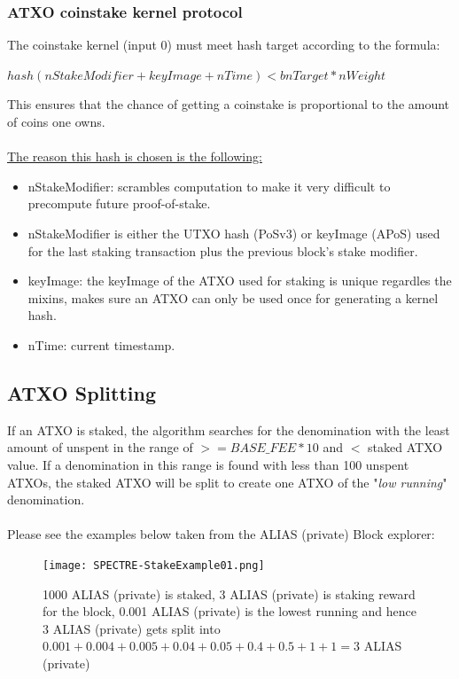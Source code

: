 \subsubsection{ATXO coinstake kernel protocol}
The coinstake kernel (input 0) must meet hash target according to the formula:



\vspace{5mm} %
$ hash(nStakeModifier + keyImage + nTime) < bnTarget * nWeight  $
\vspace{5mm} %

\noindent
This ensures that the chance of getting a coinstake is proportional to
the amount of coins one owns.
\\
\\
\noindent
\underline{The reason this hash is chosen is the following:}
\begin{itemize}
	\item nStakeModifier: scrambles computation to make it very difficult
	to precompute future proof-of-stake.
	\item nStakeModifier is either the UTXO hash (PoSv3) or keyImage (APoS) 
	used for the last staking transaction plus the previous block's stake 
	modifier.
	\item keyImage: the keyImage of the ATXO used for staking is unique 
	regardles the mixins, makes sure an ATXO can only be used once for 
	generating a kernel hash.
	\item nTime: current timestamp.
\end{itemize}



\subsection{ATXO Splitting}
If an ATXO is staked, the algorithm searches for the denomination with the
least amount of unspent in the range of  $>= BASE\_FEE * 10$ and $<$ staked
ATXO value. If a denomination in this range is found with less than 100
unspent ATXOs, the staked ATXO will be split to create one ATXO of the
"\textit{low running}" denomination.
\\
\\
\noindent
Please see the examples below taken from the ALIAS (private) Block explorer:

\begin{figure}[ht]
	
	\centering
	\texttt{[image: SPECTRE-StakeExample01.png]}
	\caption{1000 ALIAS (private) is staked, 3 ALIAS (private) is staking reward for the 
	block, 0.001 ALIAS (private) is the lowest running and hence 3 ALIAS (private) gets 
	split into $0.001 + 0.004 + 0.005 + 0.04 + 0.05 + 0.4 + 0.5 + 1 + 1 = 3$ ALIAS (private)}
\end{figure}
\newpage



